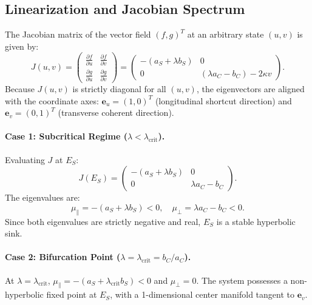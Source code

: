 \documentclass{article}
\theoremstyle{plain}
\theoremstyle{definition}
\begin{document}
\subsection{Linearization and Jacobian Spectrum}
The Jacobian matrix of the vector field $(f, g)^T$ at an arbitrary state $(u, v)$ is given by:
\begin{equation}
    J(u, v) = \begin{pmatrix}
        \frac{\partial f}{\partial u} & \frac{\partial f}{\partial v} \\
        \frac{\partial g}{\partial u} & \frac{\partial g}{\partial v}
    \end{pmatrix} = \begin{pmatrix}
        -(a_S + \lambda b_S) & 0 \\
        0 & (\lambda a_C - b_C) - 2\kappa v
    \end{pmatrix}.
\end{equation}
Because $J(u, v)$ is strictly diagonal for all $(u, v)$, the eigenvectors are aligned with the coordinate axes: $\mathbf{e}_u = (1, 0)^T$ (longitudinal shortcut direction) and $\mathbf{e}_v = (0, 1)^T$ (transverse coherent direction).

\paragraph{Case 1: Subcritical Regime ($\lambda < \lambda_{\text{crit}}$).}
Evaluating $J$ at $E_S$:
\begin{equation}
    J(E_S) = \begin{pmatrix}
        -(a_S + \lambda b_S) & 0 \\
        0 & \lambda a_C - b_C
    \end{pmatrix}.
\end{equation}
The eigenvalues are:
\begin{equation}
    \mu_{\parallel} = -(a_S + \lambda b_S) < 0, \quad \mu_{\perp} = \lambda a_C - b_C < 0.
\end{equation}
Since both eigenvalues are strictly negative and real, $E_S$ is a stable hyperbolic sink.

\paragraph{Case 2: Bifurcation Point ($\lambda = \lambda_{\text{crit}} = b_C / a_C$).}
At $\lambda = \lambda_{\text{crit}}$, $\mu_{\parallel} = -(a_S + \lambda_{\text{crit}} b_S) < 0$ and $\mu_{\perp} = 0$. The system possesses a non-hyperbolic fixed point at $E_S$, with a 1-dimensional center manifold tangent to $\mathbf{e}_v$.
\end{document}
